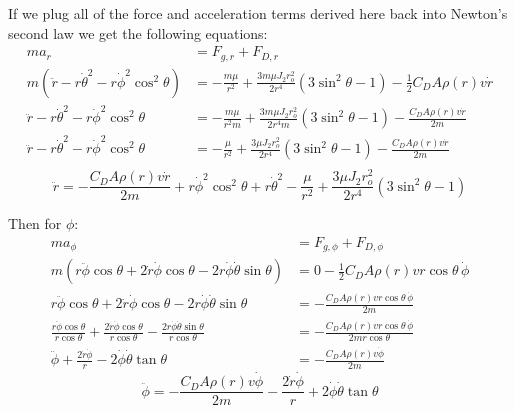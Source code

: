 \documentclass[titlepage]{article}
\begin{document}
If we plug all of the force and acceleration terms derived here back into Newton's second law we get the following equations:
\begin{equation}
	\begin{split}
		ma_r&=F_{g,r}+F_{D,r} \\
		m\left(\ddot{r}-r\dot{\theta}^2-r\dot{\phi}^2\cos^2\theta\right)&=-\frac{m\mu}{r^2}+\frac{3m\mu J_2r_o^2}{2r^4}\left(3\sin^2\theta-1\right)-\frac{1}{2}C_DA\rho(r)v\dot{r} \\
		\ddot{r}-r\dot{\theta}^2-r\dot{\phi}^2\cos^2\theta&=-\frac{m\mu}{r^2m}+\frac{3m\mu J_2r_o^2}{2r^4m}\left(3\sin^2\theta-1\right)-\frac{C_DA\rho(r)v\dot{r}}{2m} \\
		\ddot{r}-r\dot{\theta}^2-r\dot{\phi}^2\cos^2\theta&=-\frac{\mu}{r^2}+\frac{3\mu J_2r_o^2}{2r^4}\left(3\sin^2\theta-1\right)-\frac{C_DA\rho(r)v\dot{r}}{2m} \\
	\end{split}
\end{equation}
\begin{equation}
	\ddot{r}=-\frac{C_DA\rho(r)v\dot{r}}{2m}+r\dot{\phi}^2\cos^2\theta+r\dot{\theta}^2-\frac{\mu}{r^2}+\frac{3\mu J_2r_o^2}{2r^4}\left(3\sin^2\theta-1\right)
\end{equation}

Then for $\phi$:
\begin{equation}
	\begin{split}
		ma_\phi&=F_{g,\phi}+F_{D,\phi} \\
		m\left(r\ddot{\phi}\cos\theta+2\dot{r}\dot{\phi}\cos\theta-2r\dot{\phi}\dot{\theta}\sin\theta\right)&=0-\frac{1}{2}C_DA\rho(r)vr\cos\theta\,\dot{\phi} \\
		r\ddot{\phi}\cos\theta+2\dot{r}\dot{\phi}\cos\theta-2r\dot{\phi}\dot{\theta}\sin\theta&=-\frac{C_DA\rho(r)vr\cos\theta\,\dot{\phi}}{2m} \\
		\frac{r\ddot{\phi}\cos\theta}{r\cos\theta}+\frac{2\dot{r}\dot{\phi}\cos\theta}{r\cos\theta}-\frac{2r\dot{\phi}\dot{\theta}\sin\theta}{r\cos\theta}&=-\frac{C_DA\rho(r)vr\cos\theta\,\dot{\phi}}{2mr\cos\theta} \\
		\ddot{\phi}+\frac{2\dot{r}\dot{\phi}}{r}-2\dot{\phi}\dot{\theta}\tan\theta&=-\frac{C_DA\rho(r)v\dot{\phi}}{2m}
	\end{split}
\end{equation}
\begin{equation}
	\ddot{\phi}=-\frac{C_DA\rho(r)v\dot{\phi}}{2m}-\frac{2\dot{r}\dot{\phi}}{r}+2\dot{\phi}\dot{\theta}\tan\theta
\end{equation}
\end{document}
